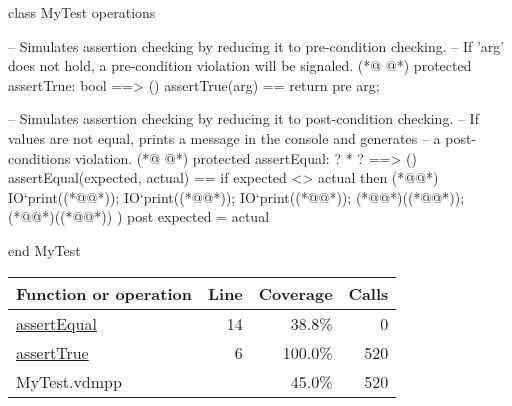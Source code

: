 \begin{vdmpp}[breaklines=true]
class MyTest
operations
 
 -- Simulates assertion checking by reducing it to pre-condition checking.
 -- If 'arg' does not hold, a pre-condition violation will be signaled.
(*@
\label{assertTrue:6}
@*)
 protected assertTrue: bool ==> ()
 assertTrue(arg) == 
  return 
 pre arg;
  
 -- Simulates assertion checking by reducing it to post-condition checking.
 -- If values are not equal, prints a message in the console and generates 
 -- a post-conditions violation.
(*@
\label{assertEqual:14}
@*)
 protected assertEqual: ? * ? ==> ()
 assertEqual(expected, actual) == 
  if expected <> actual then (*@\vdmnotcovered{(}@*)
     IO`print((*@@*));
     IO`print((*@@*)); 
     IO`print((*@@*));
     (*@@*)((*@@*));
     (*@@*)((*@@*))
  )
 post expected = actual

end MyTest
\end{vdmpp}
\bigskip
\begin{longtable}{|l|r|r|r|}
\hline
Function or operation & Line & Coverage & Calls \\
\hline
\hline
\hyperref[assertEqual:14]{assertEqual} & 14&38.8\% & 0 \\
\hline
\hyperref[assertTrue:6]{assertTrue} & 6&100.0\% & 520 \\
\hline
\hline
MyTest.vdmpp & & 45.0\% & 520 \\
\hline
\end{longtable}

